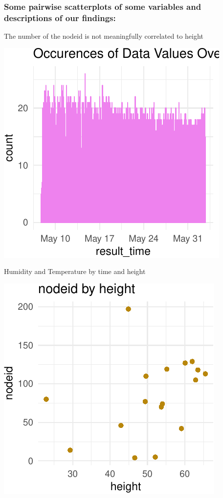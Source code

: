 \documentclass[]{article}
\begin{document}
\subsubsection{Some pairwise scatterplots of some variables and
descriptions of our
findings:}\label{some-pairwise-scatterplots-of-some-variables-and-descriptions-of-our-findings}

The number of the nodeid is not meaningfully correlated to height

\begin{center}\includegraphics{Project1WriteUp_files/figure-latex/unnamed-chunk-11-1} \end{center}

Humidity and Temperature by time and height

\begin{center}\includegraphics{Project1WriteUp_files/figure-latex/unnamed-chunk-12-1} \end{center}
\end{document}

